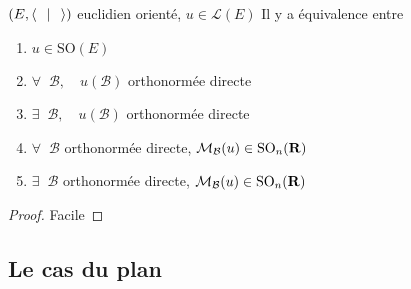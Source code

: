 \begin{prop}
    \Hyp $(E, \scalar{\;}{\;} )$ euclidien orienté, $u \in  \mathcal  L(E)$
    \Conc Il y a équivalence entre \begin{enumerate}
        \item $u \in  \mathrm {SO}(E)$
        \item $\forall \;\; \mathcal  B, \quad  u(\mathcal  B)$ orthonormée directe
        \item $\exists \;\; \mathcal  B, \quad  u(\mathcal  B)$ orthonormée directe
        \item $\forall \;\; \mathcal  B$ orthonormée directe, $\mathcal M_{\mathcal  B}(u) \in  \mathrm  {SO}_n(\mathbf R)$
        \item $\exists \;\; \mathcal  B$ orthonormée directe, $\mathcal M_{\mathcal  B}(u) \in  \mathrm  {SO}_n(\mathbf R)$
    \end{enumerate}
\end{prop}

\begin{proof}
Facile
\end{proof}

\subsection{Le cas du plan}

